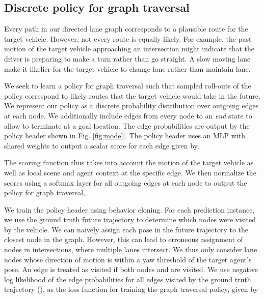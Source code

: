 \documentclass{article}
\begin{document}
\subsection{Discrete policy for graph traversal}
\label{sec:policy}

Every path in our directed lane graph corresponds to a plausible route for the target vehicle. However, not every route is equally likely. For example, the past motion of the target vehicle approaching an intersection might indicate that the driver is preparing to make a turn rather than go straight. A slow moving lane make it likelier for the target vehicle to change lane rather than maintain lane. 

We seek to learn a policy  for graph traversal such that sampled roll-outs of the policy correspond to likely routes that the target vehicle would take in the future. We represent our policy as a discrete probability distribution over outgoing edges at each node. We additionally include edges from every node to an \textit{end} state to allow  to terminate at a goal location. 
The edge probabilities are output by the policy header shown in Fig. \ref{fig:model}. The policy header uses an MLP with shared weights to output a scalar score for each edge  given by,





The scoring function thus takes into account the motion of the target vehicle as well as local scene and agent context at the specific edge. We then normalize the scores using a softmax layer for all outgoing edges at each node to output the policy for graph traversal,




We train the policy header using behavior cloning. For each prediction instance, we use the ground truth future trajectory to determine which nodes were visited by the vehicle. We can naively assign each pose in the future trajectory to the closest node in the graph. However, this can lead to erroneous assignment of nodes in intersections, where multiple lanes intersect. We thus only consider lane nodes whose direction of motion is within a yaw threshold of the target agent's pose. An edge  is treated as visited if both nodes  and  are visited. We use negative log likelihood of the edge probabilities for all edges visited by the ground truth trajectory (), as the loss function for training the graph traversal policy, given by 
\end{document}
